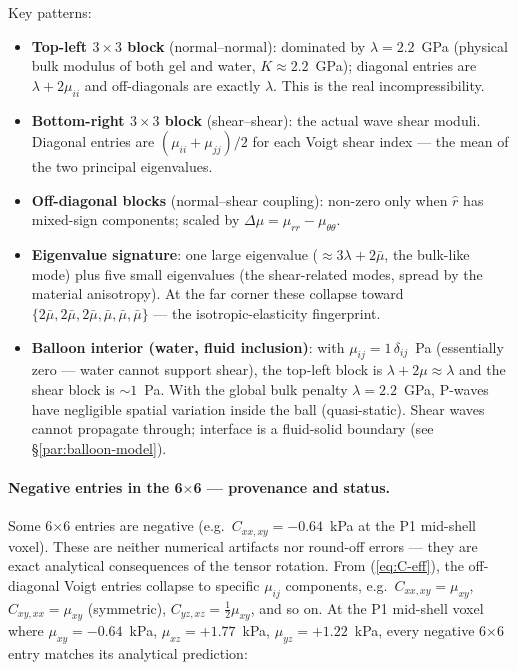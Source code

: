 \documentclass[11pt,letterpaper]{article}
\begin{document}
\vspace{8pt}
\noindent\normalsize Key patterns:
\begin{itemize}
\item \textbf{Top-left $3{\times}3$ block} (normal--normal): dominated by
      $\lambda = 2.2$~GPa (physical bulk modulus of both gel and water,
      $K \approx 2.2$~GPa); diagonal entries are $\lambda + 2\mu_{ii}$
      and off-diagonals are exactly $\lambda$. This is the
      real incompressibility.
\item \textbf{Bottom-right $3{\times}3$ block} (shear--shear): the actual
      wave shear moduli. Diagonal entries are $(\mu_{ii}+\mu_{jj})/2$
      for each Voigt shear index — the mean of the two principal
      eigenvalues.
\item \textbf{Off-diagonal blocks} (normal--shear coupling): non-zero
      only when $\hat r$ has mixed-sign components; scaled by
      $\Delta\mu = \mu_{rr}-\mu_{\theta\theta}$.
\item \textbf{Eigenvalue signature}: one large eigenvalue
      ($\approx 3\lambda + 2\bar\mu$, the bulk-like mode) plus five
      small eigenvalues (the shear-related modes, spread by the
      material anisotropy). At the far corner these collapse toward
      $\{2\bar\mu, 2\bar\mu, 2\bar\mu, \bar\mu, \bar\mu, \bar\mu\}$
      — the isotropic-elasticity fingerprint.
\item \textbf{Balloon interior (water, fluid inclusion)}:
      with $\mu_{ij} = 1\,\delta_{ij}$~Pa (essentially zero — water
      cannot support shear), the top-left block is
      $\lambda + 2\mu \approx \lambda$ and the shear block is
      $\sim 1$~Pa. With the global bulk penalty $\lambda = 2.2$~GPa,
      P-waves have negligible spatial variation inside the ball
      (quasi-static). Shear waves cannot propagate through; interface
      is a fluid-solid boundary (see \S\ref{par:balloon-model}).
\end{itemize}

\paragraph{Negative entries in the 6$\times$6 --- provenance and status.}
Some 6$\times$6 entries are negative (e.g.\ $C_{xx,xy} = -0.64$~kPa
at the P1 mid-shell voxel). These are neither numerical artifacts
nor round-off errors --- they are exact analytical consequences of
the tensor rotation. From (\ref{eq:C-eff}), the off-diagonal Voigt
entries collapse to specific $\mu_{ij}$ components, e.g.\
$C_{xx,xy} = \mu_{xy}$, $C_{xy,xx} = \mu_{xy}$ (symmetric),
$C_{yz,xz} = \tfrac{1}{2}\mu_{xy}$, and so on. At the P1 mid-shell
voxel where $\mu_{xy} = -0.64$~kPa, $\mu_{xz} = +1.77$~kPa,
$\mu_{yz} = +1.22$~kPa, every negative 6$\times$6 entry matches its
analytical prediction:
\end{document}
